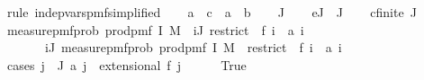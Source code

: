 \begin{isabellebody}
%
\isadelimproof
%
\endisadelimproof
%
\isatagproof
{}\isamarkupfalse%
\ {\isacharparenleft}{\kern0pt}rule\ indep{\isacharunderscore}{\kern0pt}vars{\isacharunderscore}{\kern0pt}pmf{\isacharbrackleft}{\kern0pt}simplified{\isacharbrackright}{\kern0pt}{\isacharparenright}{\kern0pt}\isanewline
\ \ \isamarkupfalse%
\ a\ {\isacharcolon}{\kern0pt}{\isacharcolon}{\kern0pt}\ {\isachardoublequoteopen}{\isacharprime}{\kern0pt}c\ {\isasymRightarrow}\ {\isacharprime}{\kern0pt}a\ {\isasymRightarrow}\ {\isacharprime}{\kern0pt}b{\isachardoublequoteclose}\isanewline
\ \ \isamarkupfalse%
\ J{\isacharprime}{\kern0pt}\isanewline
\ \ \isamarkupfalse%
\ e{\isacharcolon}{\kern0pt}{\isachardoublequoteopen}J{\isacharprime}{\kern0pt}\ {\isasymsubseteq}\ J{\isachardoublequoteclose}\isanewline
\ \ \isamarkupfalse%
\ c{\isacharcolon}{\kern0pt}{\isachardoublequoteopen}finite\ J{\isacharprime}{\kern0pt}{\isachardoublequoteclose}\isanewline
\ \ \isamarkupfalse%
\ {\isachardoublequoteopen}measure{\isacharunderscore}{\kern0pt}pmf{\isachardot}{\kern0pt}prob\ {\isacharparenleft}{\kern0pt}prod{\isacharunderscore}{\kern0pt}pmf\ I\ M{\isacharparenright}{\kern0pt}\ {\isacharbraceleft}{\kern0pt}{\isasymomega}{\isachardot}{\kern0pt}\ {\isasymforall}i{\isasymin}J{\isacharprime}{\kern0pt}{\isachardot}{\kern0pt}\ restrict\ {\isasymomega}\ {\isacharparenleft}{\kern0pt}f\ i{\isacharparenright}{\kern0pt}\ {\isacharequal}{\kern0pt}\ a\ i{\isacharbraceright}{\kern0pt}\ {\isacharequal}{\kern0pt}\isanewline
\ \ \ \ \ \ \ {\isacharparenleft}{\kern0pt}{\isasymProd}i{\isasymin}J{\isacharprime}{\kern0pt}{\isachardot}{\kern0pt}\ measure{\isacharunderscore}{\kern0pt}pmf{\isachardot}{\kern0pt}prob\ {\isacharparenleft}{\kern0pt}prod{\isacharunderscore}{\kern0pt}pmf\ I\ M{\isacharparenright}{\kern0pt}\ {\isacharbraceleft}{\kern0pt}{\isasymomega}{\isachardot}{\kern0pt}\ restrict\ {\isasymomega}\ {\isacharparenleft}{\kern0pt}f\ i{\isacharparenright}{\kern0pt}\ {\isacharequal}{\kern0pt}\ a\ i{\isacharbraceright}{\kern0pt}{\isacharparenright}{\kern0pt}{\isachardoublequoteclose}\isanewline
\ \ \isamarkupfalse%
\ {\isacharparenleft}{\kern0pt}cases\ {\isachardoublequoteopen}{\isasymforall}j\ {\isasymin}\ J{\isacharprime}{\kern0pt}{\isachardot}{\kern0pt}\ a\ j\ {\isasymin}\ extensional\ {\isacharparenleft}{\kern0pt}f\ j{\isacharparenright}{\kern0pt}{\isachardoublequoteclose}{\isacharparenright}{\kern0pt}\isanewline
\ \ \ \ \isamarkupfalse%
\ True\isanewline
\ \ \ \ \isamarkupfalse%

\end{isabellebody}
